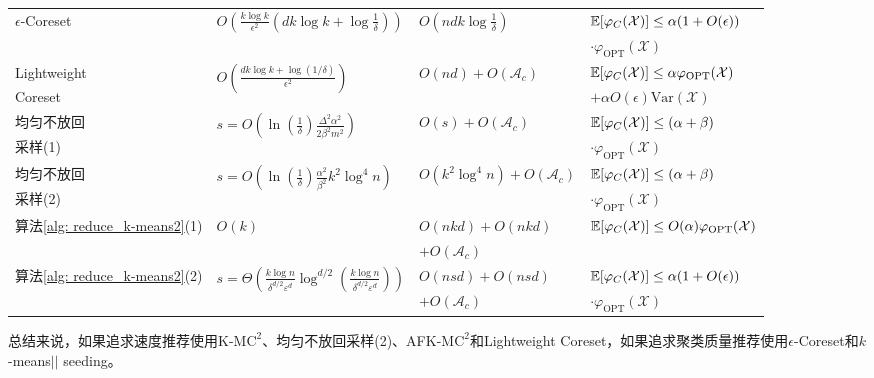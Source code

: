 \begin{table}
\begin{tabular}{llll}
		\multirow{2}{*}{$\epsilon$-Coreset} & \multirow{2}{*}{$O(\frac{k\log k}{\epsilon^2} (dk\log k+\log\frac{1}{\delta}))$} & \multirow{2}{*}{$O(ndk\log\frac{1}{\delta})$} & $\mathbb{E}[\varphi_C(\mathcal{X})] \leq \alpha(1+O(\epsilon))$ \\
		& & & $\cdot \varphi_{\text{OPT}}(\mathcal{X})$ \\

		Lightweight & \multirow{2}{*}{$O(\frac{dk\log k + \log(1/\delta)}{\epsilon^2})$} & \multirow{2}{*}{$O(nd)+O(\mathcal{A}_c)$} & $\mathbb{E}[\varphi_C(\mathcal{X})] \leq \alpha \varphi_{\text{OPT}}(\mathcal{X})$ \\
		Coreset & & & $+ \alpha O(\epsilon) \text{Var}(\mathcal{X})$\\

		均匀不放回 & \multirow{2}{*}{$s = O(\ln \left(\frac{1}{\delta}\right) \frac{\Delta^{2} \alpha^{2}}{2 \beta^{2} m^{2}})$} & \multirow{2}{*}{$O(s)+O(\mathcal{A}_c)$} & $\mathbb{E}[\varphi_C(\mathcal{X})] \leq (\alpha+\beta)$ \\
		采样(1) &  &  & $\cdot \varphi_{\text{OPT}}(\mathcal{X})$ \\

		均匀不放回 & \multirow{2}{*}{$s = O(\ln(\frac{1}{\delta})\frac{\alpha^2}{\beta^2}k^2\log^4 n)$} & \multirow{2}{*}{$O(k^2 \log^4 n)+O(\mathcal{A}_c)$} & $\mathbb{E}[\varphi_C(\mathcal{X})] \leq (\alpha+\beta)$ \\
		采样(2) &  &  & $\cdot \varphi_{\text{OPT}}(\mathcal{X})$ \\

		\multirow{2}{*}{算法\ref{alg: reduce_k-means2}(1)} & \multirow{2}{*}{$O(k)$} & $O(nkd)+O(nkd)$ & \multirow{2}{*}{$\mathbb{E}[\varphi_C(\mathcal{X})] \leq O(\alpha) \varphi_{\text{OPT}}(\mathcal{X})$} \\
		& & $+O(\mathcal{A}_c)$ & \\

		\multirow{2}{*}{算法\ref{alg: reduce_k-means2}(2)} & \multirow{2}{*}{$s = \Theta\left(\frac{k \log n}{\delta^{d / 2} \varepsilon^{d}} \log ^{d / 2}\left(\frac{k \log n}{\delta^{d / 2} \varepsilon^{d}}\right)\right)$} & $O(nsd)+O(nsd)$ & $\mathbb{E}[\varphi_C(\mathcal{X})] \leq \alpha(1+O(\epsilon))$ \\
		& & $+O(\mathcal{A}_c)$ & $\cdot \varphi_{\text{OPT}}(\mathcal{X})$ \\

		\bottomrule
	\end{tabular}
\end{table}
总结来说，如果追求速度推荐使用K-M$\text{C}^2$、均匀不放回采样(2)、AFK-M$\text{C}^2$和Lightweight Coreset，如果追求聚类质量推荐使用$\epsilon$-Coreset和$k$-means\(\vert \vert\) seeding。%

